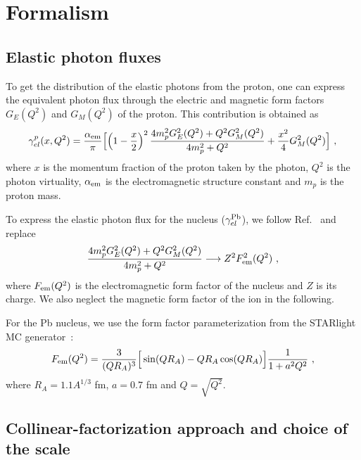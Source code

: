 \section{Formalism}

\subsection{Elastic photon fluxes}


To get the distribution of the elastic photons from the proton, one can express the equivalent photon flux through
the electric and magnetic form factors $G_E(Q^2)$ and $G_M(Q^2)$ of the proton.
This contribution is obtained as
\begin{eqnarray}
  \gamma^{p}_{el}(x,Q^2) = \frac{\alpha_{\rm{em}}}{\pi}
\Big[ \Big( 1- {x \over 2} \Big)^2 \, {4 m_p^2 G_E^2(Q^2) + Q^2 G_M^2(Q^2) \over 4m_p^2 + Q^2} + {x^2 \over 4} G_M^2(Q^2) \Big]~,
\label{proton_el_flux}
\end{eqnarray}
where $x$ is the momentum fraction of the proton taken by the photon, $Q^2$ is the photon virtuality, $\alpha_{\rm{em}}$ is the electromagnetic structure constant and $m_p$ is the proton mass.

To express the elastic photon flux for the nucleus ($\gamma^{\rm Pb}_{el}$), we follow Ref.~\cite{Budnev:1974de} and replace 
\begin{eqnarray}
 {4 m_p^2 G_E^2(Q^2) + Q^2 G_M^2(Q^2) \over 4m_p^2 + Q^2} \longrightarrow Z^2 F_{\rm em}^2(Q^2)~,
 \end{eqnarray}
where $F_{\rm em}(Q^2)$ is the electromagnetic form factor of the nucleus and $Z$ is its charge.
We also neglect the magnetic form factor of the ion in the following.

For the Pb nucleus, we use the form factor parameterization from the STARlight MC generator~\cite{Klein:2016yzr}:
\begin{eqnarray}
 F_{\rm em}(Q^2) = {3 \over (QR_A)^3}\Big[ \sin(QR_A) - QR_A \cos(QR_A) \Big] { 1 \over 1 + a^2 Q^2}~,
\end{eqnarray}
where $R_A = 1.1 A^{1/3}$ fm, $a = 0.7$ fm and $Q = \sqrt{Q^2}$.


\subsection{Collinear-factorization approach and choice of the scale}

